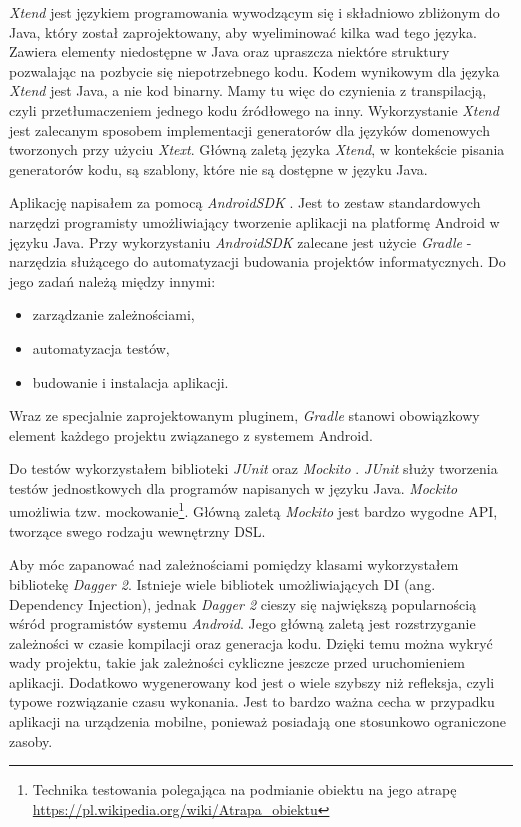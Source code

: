 \documentclass[openright]{xmgr}
\begin{document}
\textit{Xtend} jest językiem programowania wywodzącym się i składniowo zbliżonym do Java, który został zaprojektowany, aby wyeliminować kilka wad tego języka. Zawiera elementy niedostępne w Java oraz upraszcza niektóre struktury pozwalając na pozbycie się niepotrzebnego kodu. Kodem wynikowym dla języka \textit{Xtend} jest Java, a nie kod binarny. Mamy tu więc do czynienia z transpilacją, czyli przetłumaczeniem jednego kodu źródłowego na inny. Wykorzystanie \textit{Xtend} jest zalecanym sposobem implementacji generatorów dla języków domenowych tworzonych przy użyciu \textit{Xtext}. Główną zaletą języka \textit{Xtend}, w kontekście pisania generatorów kodu, są szablony, które nie są dostępne w języku Java.

Aplikację napisałem za pomocą \textit{AndroidSDK} \cite{AndroidSDK:2017:Doc}. Jest to zestaw standardowych narzędzi programisty umożliwiający tworzenie aplikacji na platformę Android w języku Java. Przy wykorzystaniu \textit{AndroidSDK} zalecane jest użycie \textit{Gradle} \cite{Gradle:2017:Doc} - narzędzia służącego do automatyzacji budowania projektów informatycznych. Do jego zadań należą między innymi:
\begin{itemize}
\item zarządzanie zależnościami,
\item automatyzacja testów,
\item budowanie i instalacja aplikacji.
\end{itemize}
Wraz ze specjalnie zaprojektowanym pluginem, \textit{Gradle} stanowi obowiązkowy element każdego projektu związanego z systemem Android.

Do testów wykorzystałem biblioteki \textit{JUnit} \cite{JUnit:2017:Doc} oraz \textit{Mockito} \cite{Mockito:2017:Doc}. \textit{JUnit} służy tworzenia testów jednostkowych dla programów napisanych w języku Java. \textit{Mockito} umożliwia tzw. mockowanie\footnote{Technika testowania polegająca na podmianie obiektu na jego atrapę \url{https://pl.wikipedia.org/wiki/Atrapa_obiektu}}.  Główną zaletą \textit{Mockito} jest bardzo wygodne API, tworzące swego rodzaju wewnętrzny DSL.

Aby móc zapanować nad zależnościami pomiędzy klasami wykorzystałem bibliotekę \textit{Dagger 2}.
Istnieje wiele bibliotek umożliwiających DI (ang. Dependency Injection), jednak \textit{Dagger 2} cieszy się największą popularnością wśród programistów systemu \textit{Android}. Jego główną zaletą jest rozstrzyganie zależności w czasie kompilacji oraz generacja kodu. Dzięki temu można wykryć wady projektu, takie jak zależności cykliczne jeszcze przed uruchomieniem aplikacji. Dodatkowo wygenerowany kod jest o wiele szybszy niż refleksja, czyli typowe rozwiązanie czasu wykonania. Jest to bardzo ważna cecha w przypadku aplikacji na urządzenia mobilne, ponieważ posiadają one stosunkowo ograniczone zasoby. 
\end{document}
